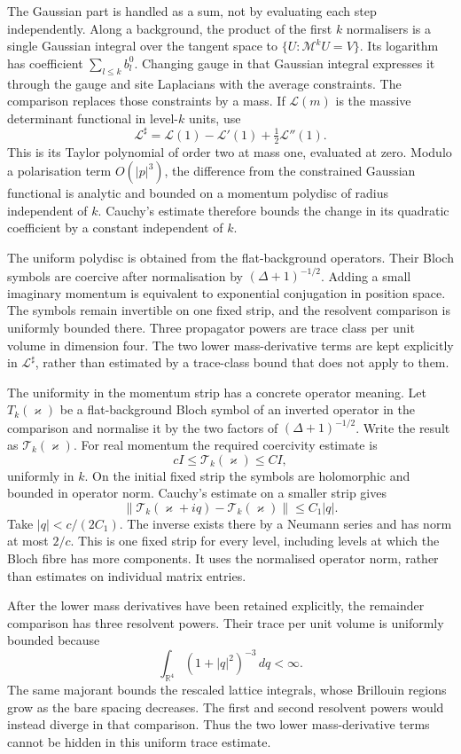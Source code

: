 \documentclass[11pt,letterpaper,reqno]{amsart}
\theoremstyle{definition}
\theoremstyle{remark}
\begin{document}
The Gaussian part is handled as a sum, not by evaluating each
step independently. Along a background, the product of the first
$k$ normalisers is a single Gaussian integral over the tangent
space to $\{U:\mathcal M^kU=V\}$. Its logarithm has coefficient
$\sum_{l\le k}b_l^0$. Changing gauge in that Gaussian integral
expresses it through the gauge and site Laplacians with the
average constraints. The comparison replaces those constraints
by a mass. If $\mathcal L(m)$ is the massive determinant
functional in level-$k$ units, use
\[
 \mathcal L^\sharp=
 \mathcal L(1)-\mathcal L'(1)+\tfrac12\mathcal L''(1).
\]
This is its Taylor polynomial of order two at mass one,
evaluated at zero. Modulo a polarisation term $O(|p|^3)$, the
difference from the constrained Gaussian functional is analytic
and bounded on a momentum polydisc of radius independent of
$k$. Cauchy's estimate therefore bounds the change in its
quadratic coefficient by a constant independent of $k$.

The uniform polydisc is obtained from the flat-background
operators. Their Bloch symbols are coercive after normalisation
by $(\Delta+1)^{-1/2}$. Adding a small imaginary momentum is
equivalent to exponential conjugation in position space.
The symbols remain invertible on one fixed strip, and the
resolvent comparison is uniformly bounded there. Three
propagator powers are trace class per unit volume in dimension
four. The two lower mass-derivative terms are kept explicitly
in $\mathcal L^\sharp$, rather than estimated by a trace-class
bound that does not apply to them.

The uniformity in the momentum strip
has a concrete operator meaning. Let
$T_k(\varkappa)$ be a flat-background
Bloch symbol of an inverted operator
in the comparison and normalise it by
the two factors of
$(\Delta+1)^{-1/2}$. Write the result
as $\mathcal T_k(\varkappa)$.
For real momentum the required
coercivity estimate is
\[
 cI\le\mathcal T_k(\varkappa)\le CI,
\]
uniformly in $k$. On the initial
fixed strip the symbols are
holomorphic and bounded in operator
norm. Cauchy's estimate on a
smaller strip gives
\[
 \|\mathcal T_k(\varkappa+iq)
                    -\mathcal T_k(\varkappa)\|
                            \le C_1|q|.
\]
Take $|q|<c/(2C_1)$. The inverse
exists there by a Neumann series
and has norm at most $2/c$.
This is one fixed strip for every
level, including levels at which
the Bloch fibre has more
components. It uses the
normalised operator norm,
rather than estimates on
individual matrix entries.

After the lower mass derivatives
have been retained explicitly,
the remainder comparison has
three resolvent powers. Their
trace per unit volume is
uniformly bounded because
\[
 \int_{\mathbb R^4}(1+|q|^2)^{-3}\,dq<\infty.
\]
The same majorant bounds the
rescaled lattice integrals,
whose Brillouin regions grow
as the bare spacing decreases.
The first and second resolvent
powers would instead diverge
in that comparison. Thus the
two lower mass-derivative terms
cannot be hidden in this
uniform trace estimate.
\end{document}
